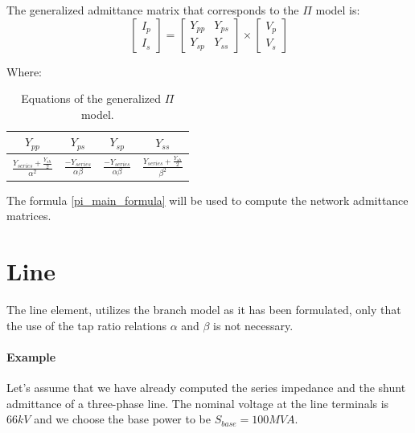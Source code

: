 \documentclass{tufte-book}
\begin{document}
The generalized admittance matrix that corresponds to the $\Pi$ model is:
\begin{equation}
\left[\begin{array}{c}
I_p \\
I_s
\end{array}\right] = \left[\begin{array}{cc}
Y_{pp} & Y_{ps} \\
Y_{sp} & Y_{ss}
\end{array}\right] \times \left[\begin{array}{c}
V_p \\
V_s
\end{array}\right]
\label{pi_main_formula}
\end{equation}

Where:

\begin{table}[h!]
\begin{center}
\begin{tabular}{cccc}
\toprule

$Y_{pp}$ &  $Y_{ps}$ & $Y_{sp}$ & $Y_{ss}$\\

\midrule

$\frac{Y_{series} + \frac{Y_{sh}}{2}}{\alpha^2}$ &  $\frac{-Y_{series}}{\alpha\beta}$ & $\frac{-Y_{series}}{\alpha\beta}$ & $\frac{Y_{series} + \frac{Y_{sh}}{2}}{\beta^2}$\\

\bottomrule
\end{tabular}
\end{center}
  \caption{Equations of the generalized $\Pi$ model.}
  \label{pi_model_equations}
\end{table}

The formula \ref{pi_main_formula} will be used to compute the network admittance matrices.

\section{Line}

The line element, utilizes the branch model as it has been formulated, only that the use of the tap ratio relations $\alpha$ and $\beta$ is not necessary.

\paragraph{Example}

Let's assume that we have already computed the series impedance and the shunt admittance of a three-phase line. The nominal voltage at the line terminals is $66kV$ and we choose the base power to be $S_{base}=100MVA$.
\end{document}
